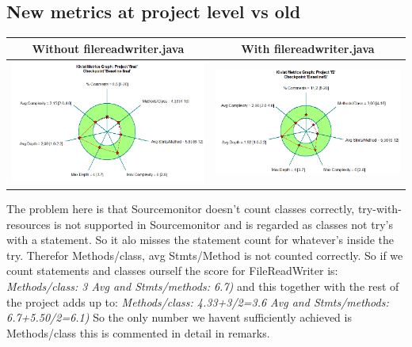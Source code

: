 \documentclass{article}
\begin{document}
\subsection{New metrics at project level vs old} %
\hspace*{-0.5cm}
\begin{tabulary}{0.5\textwidth}{| c | c |}
 \hline
Without filereadwriter.java & With filereadwriter.java \\ \hline
\includegraphics[scale=0.4]{Project-after-with-filereadwriter.png} & \includegraphics[scale=0.4]{Kiviat-project-without-filereadwriter.png} \\ \hline
\end{tabulary}\vspace{0.2cm}

The problem here is that Sourcemonitor doesn't count classes correctly, try-with-resources is not supported in Sourcemonitor and is regarded as classes not try's with a statement. So it alo misses the statement count for whatever's inside the try. Therefor Methods/class, avg Stmts/Method is not counted correctly. So if we count statements and classes ourself the score for FileReadWriter is:
\textit{Methods/class: 3 Avg and Stmts/methods: 6.7)} and this together with the rest of the project adds up to: \textit{Methods/class: 4.33+3/2=3.6 Avg and Stmts/methods: 6.7+5.50/2=6.1)}
So the only number we havent sufficiently achieved is Methods/class this is commented in detail in remarks.
\end{document}
